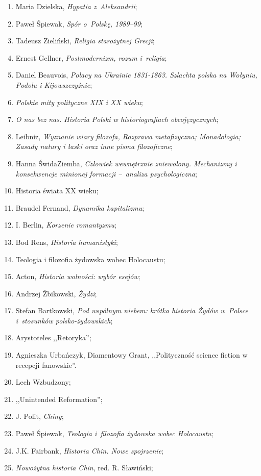 \documentclass[a4paper,11pt]{article}
\begin{document}
\begin{enumerate}
\item Maria Dzielska, \emph{Hypatia z~Aleksandrii};
\item Paweł Śpiewak, \emph{Spór o~Polskę, 1989--99};
\item Tadeusz Zieliński, \emph{Religia starożytnej Grecji};
\item Ernest Gellner, \emph{Postmodernizm, rozum i~religia};
\item Daniel Beauvois, \emph{Polacy na Ukrainie 1831-1863. Szlachta
    polska na Wołyniu, Podolu i Kijowszczyźnie};
\item \emph{Polskie mity polityczne XIX i XX wieku};
\item \emph{O nas bez nas. Historia Polski w historiografiach
    obcojęzycznych};
\item Leibniz, \emph{Wyznanie wiary filozofa, Rozprawa metafizyczna;
    Monadologia; Zasady natury i łaski oraz inne pisma filozoficzne};
\item Hanna Świda\dywiz Ziemba, \emph{Człowiek wewnętrznie zniewolony.
    Mechanizmy i konsekwencje minionej formacji --~analiza
    psychologiczna};
\item Historia świata XX wieku;
\item Braudel Fernand, \emph{Dynamika kapitalizmu};
\item I. Berlin, \emph{Korzenie romantyzmu};
\item Bod Rens, \emph{Historia humanistyki};
\item Teologia i filozofia żydowska wobec Holocaustu;
\item Acton, \emph{Historia wolności: wybór esejów};
\item Andrzej Żbikowski, \emph{Żydzi};
\item Stefan Bartkowski, \emph{Pod wspólnym niebem: krótka historia
    Żydów w~Polsce i~stosunków polsko-żydowskich};
\item Arystoteles ,,Retoryka'';
\item Agnieszka Urbańczyk, Diamentowy Grant, ,,Polityczność science
  fiction w recepcji fanowskie''.
\item Lech Wzbudzony;
\item ,,Unintended Reformation'';
\item J. Polit, \emph{Chiny};
\item Paweł Śpiewak, \emph{Teologia i~filozofia żydowska wobec
    Holocaustu};
\item J.K. Fairbank, \emph{Historia Chin. Nowe spojrzenie};
\item \emph{Nowożytna historia Chin}, red. R. Sławiński;

\end{enumerate}
\end{document}
